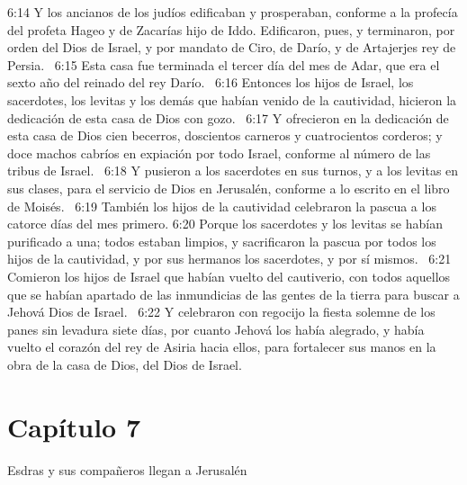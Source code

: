 6:14 Y los ancianos de los judíos edificaban y prosperaban, conforme a la profecía del profeta Hageo y de Zacarías hijo de Iddo. Edificaron, pues, y terminaron, por orden del Dios de Israel, y por mandato de Ciro, de Darío, y de Artajerjes rey de Persia.  
6:15 Esta casa fue terminada el tercer día del mes de Adar, que era el sexto año del reinado del rey Darío.  
6:16 Entonces los hijos de Israel, los sacerdotes, los levitas y los demás que habían venido de la cautividad, hicieron la dedicación de esta casa de Dios con gozo.  
6:17 Y ofrecieron en la dedicación de esta casa de Dios cien becerros, doscientos carneros y cuatrocientos corderos; y doce machos cabríos en expiación por todo Israel, conforme al número de las tribus de Israel.  
6:18 Y pusieron a los sacerdotes en sus turnos, y a los levitas en sus clases, para el servicio de Dios en Jerusalén, conforme a lo escrito en el libro de Moisés.  
6:19 También los hijos de la cautividad celebraron la pascua a los catorce días del mes primero. 
6:20 Porque los sacerdotes y los levitas se habían purificado a una; todos estaban limpios, y sacrificaron la pascua por todos los hijos de la cautividad, y por sus hermanos los sacerdotes, y por sí mismos.  
6:21 Comieron los hijos de Israel que habían vuelto del cautiverio, con todos aquellos que se habían apartado de las inmundicias de las gentes de la tierra para buscar a Jehová Dios de Israel.  
6:22 Y celebraron con regocijo la fiesta solemne de los panes sin levadura siete días, por cuanto Jehová los había alegrado, y había vuelto el corazón del rey de Asiria hacia ellos, para fortalecer sus manos en la obra de la casa de Dios, del Dios de Israel.  
\section*{Capítulo 7 }
Esdras y sus compañeros llegan a Jerusalén  

